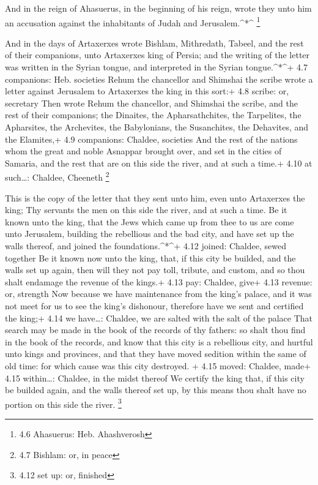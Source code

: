  And in the reign of Ahasuerus, in the beginning of his
reign, wrote they unto him an accusation against the inhabitants of
Judah and Jerusalem.\^{}*\^{} \footnote{4.6 Ahasuerus: Heb. Ahashverosh}

 And in the days of Artaxerxes wrote Bishlam, Mithredath,
Tabeel, and the rest of their companions, unto Artaxerxes king of
Persia; and the writing of the letter was written in the Syrian tongue,
and interpreted in the Syrian tongue.\^{}*\^{}+ 4.7 companions: Heb.
societies  Rehum the chancellor and Shimshai the scribe
wrote a letter against Jerusalem to Artaxerxes the king in this sort:+
4.8 scribe: or, secretary  Then wrote Rehum the chancellor,
and Shimshai the scribe, and the rest of their companions; the Dinaites,
the Apharsathchites, the Tarpelites, the Apharsites, the Archevites, the
Babylonians, the Susanchites, the Dehavites, and the Elamites,+ 4.9
companions: Chaldee, societies  And the rest of the nations
whom the great and noble Asnappar brought over, and set in the cities of
Samaria, and the rest that are on this side the river, and at such a
time.+ 4.10 at such\ldots: Chaldee, Cheeneth \footnote{4.7 Bishlam: or,
  in peace}

 This is the copy of the letter that they sent unto him,
even unto Artaxerxes the king; Thy servants the men on this side the
river, and at such a time.  Be it known unto the king, that
the Jews which came up from thee to us are come unto Jerusalem, building
the rebellious and the bad city, and have set up the walls thereof, and
joined the foundations.\^{}*\^{}+ 4.12 joined: Chaldee, sewed together
 Be it known now unto the king, that, if this city be
builded, and the walls set up again, then will they not pay toll,
tribute, and custom, and so thou shalt endamage the revenue of the
kings.+ 4.13 pay: Chaldee, give+ 4.13 revenue: or, strength
 Now because we have maintenance from the king's palace,
and it was not meet for us to see the king's dishonour, therefore have
we sent and certified the king;+ 4.14 we have\ldots: Chaldee, we are
salted with the salt of the palace  That search may be made
in the book of the records of thy fathers: so shalt thou find in the
book of the records, and know that this city is a rebellious city, and
hurtful unto kings and provinces, and that they have moved sedition
within the same of old time: for which cause was this city destroyed. +
4.15 moved: Chaldee, made+ 4.15 within\ldots: Chaldee, in the midst
thereof  We certify the king that, if this city be builded
again, and the walls thereof set up, by this means thou shalt have no
portion on this side the river. \footnote{4.12 set up: or, finished}

